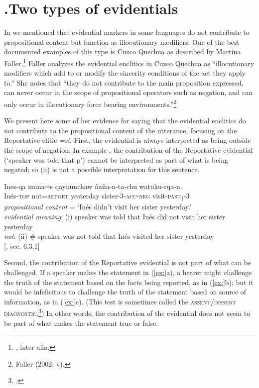 \section{.Two types of evidentials}\label{sec:} %

In  we mentioned that evidential markers in some languages do not contribute to propositional content but function as illocutionary modifiers. One of the best documented examples of this type is Cuzco Quechua as described by Martina Faller.\footnote{\citet{Faller2002,Faller2003,Faller2006}, inter alia.} Faller analyzes the evidential enclitics in Cuzco Quechua as “illocutionary modifiers which add to or modify the sincerity conditions of the act they apply to.” She notes that “they do not contribute to the main proposition expressed, can never occur in the scope of propositional operators such as negation, and can only occur in illocutionary force bearing environments.”\footnote{Faller (2002: v).}



We present here some of her evidence for saying that the evidential enclitics do not contribute to the propositional content of the utterance, focusing on the Reportative clitic \textit{=si}. First, the evidential is always interpreted as being outside the scope of negation. In example , the contribution of the Reportative evidential (‘speaker was told that p’) cannot be interpreted as part of what is being negated; so (ii) is not a possible interpretation for this sentence.


\ea
\gll Ines-qa  mana=s  qaynunchaw  ñaña-n-ta-chu  watuku-rqa-n.\\
Inés-\textsc{top}  not=\textsc{report}  yesterday  sister-3-\textsc{acc-neg}  visit\textsc{-past}\textsc{\textsubscript{1}}-3\\
\glt \textit{propositional content} = ‘Inés didn’t visit her sister yesterday.’\\
\textit{evidential meaning}: (i) speaker was told that Inés did not visit her sister yesterday\\
  \textit{not}:  (ii) \# speaker was not told that Inés visited her sister yesterday\\
{}[\citealt{Faller2002}, sec. 6.3.1]
\z


Second, the contribution of the Reportative evidential is not part of what can be challenged. If a speaker makes the statement in (\ref{ex:}a), a hearer might challenge the truth of the statement based on the facts being reported, as in (\ref{ex:}b); but it would be infelicitous to challenge the truth of the statement based on source of information, as in (\ref{ex:}c). (This test is sometimes called the \textsc{assent/dissent diagnostic}.\footnote{\citet{Papafragou2006}.}) In other words, the contribution of the evidential does not seem to be part of what makes the statement true or false.


